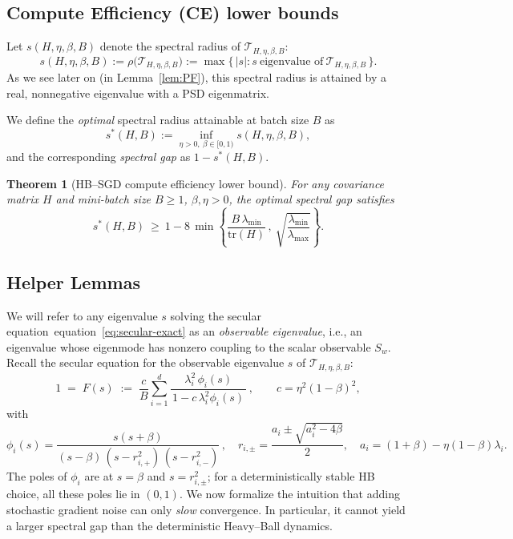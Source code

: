 \documentclass{article}
\def\eqref#1{equation~\ref{#1}}
\newtheorem{theorem}{Theorem}
\begin{document}
\subsection{Compute Efficiency (CE) lower bounds}

Let $s(H,\eta,\beta,B)$ denote the spectral radius of
$\mathcal{T}_{H,\eta,\beta,B}$:
\[
s(H,\eta,\beta,B)
:= \rho\big(\mathcal{T}_{H,\eta,\beta,B}\big)
:= \max\{\,|s| : s\ \text{eigenvalue of}\ \mathcal{T}_{H,\eta,\beta,B}\,\}.
\]
As we see later on (in Lemma~\ref{lem:PF}), this spectral radius is attained by a real,
nonnegative eigenvalue with a PSD eigenmatrix.

We define the \emph{optimal} spectral radius attainable at batch size $B$ as
\[
s^*(H,B) := \inf_{\eta>0,\ \beta\in[0,1)} s(H,\eta,\beta,B),
\]
and the corresponding \emph{spectral gap} as $1 - s^*(H,B)$.

\begin{theorem}[HB--SGD compute efficiency lower bound]
\label{thm:ce}
For any covariance matrix $H$ and mini-batch size $B\ge 1$, $\beta,\eta>0$, the optimal
spectral gap satisfies
\[
\qquad
s^*(H,B)
\ \ge\ 1-8\,\min\!\left\{
\frac{B\,\lambda_{\min}}{\mathrm{tr}(H)}\,,\
\sqrt{\frac{\lambda_{\min}}{\lambda_{\max}}}
\right\}.
\qquad
\]
\end{theorem}


\subsection{Helper Lemmas}

We will refer to any eigenvalue $s$ solving the secular
equation~\eqref{eq:secular-exact} as an \emph{observable eigenvalue},
i.e., an eigenvalue whose eigenmode has nonzero coupling to the scalar
observable $S_w$.
Recall the secular equation for the observable eigenvalue $s$ of
$\mathcal{T}_{H,\eta,\beta,B}$:
\begin{equation}
\label{eq:sec-function}
1
\;=\;
F(s)
\;:=\;
\frac{c}{B}\sum_{i=1}^d
\frac{\lambda_i^2\,\phi_i(s)}{\,1- c\,\lambda_i^2 \phi_i(s)\,}\,,
\qquad
c=\eta^2(1-\beta)^2,
\end{equation}
with
\begin{equation}
\label{eq:phi-def}
\phi_i(s)
=
\frac{s(s+\beta)}{(s-\beta)\,(s-r_{i,+}^2)\,(s-r_{i,-}^2)}\,,
\quad
r_{i,\pm}=\frac{a_i\pm\sqrt{a_i^2-4\beta}}{2},\quad
a_i=(1+\beta)-\eta(1-\beta)\lambda_i.
\end{equation}
The poles of $\phi_i$ are at $s=\beta$ and $s=r_{i,\pm}^2$; for a
deterministically stable HB choice, all these poles lie in $(0,1)$.
We now formalize the intuition that adding stochastic gradient noise can
only \emph{slow} convergence. In particular, it cannot yield a larger
spectral gap than the deterministic Heavy--Ball dynamics.
\end{document}
